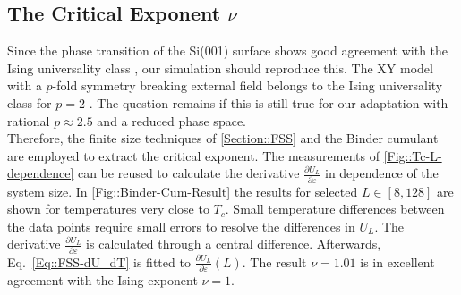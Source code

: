 	\subsection{The Critical Exponent ${\nu}$} \label{Section::static-scaling}
	Since the phase transition of the Si(001) surface shows good agreement with the Ising universality class \cite{brand2023critical}, our simulation should reproduce this. The XY model with a $p$-fold symmetry breaking external field belongs to the Ising universality class for $p=2$ \cite{jose1977renormalization}. The question remains if this is still true for our adaptation with rational $p \approx 2.5$ and a reduced phase space. \\
	
	Therefore, the finite size techniques of \autoref{Section::FSS} and the Binder cumulant are employed to extract the critical exponent. The measurements of \autoref{Fig::Tc-L-dependence} can be reused to calculate the derivative $\tfrac{\partial U_L}{\partial \varepsilon}$ in dependence of the system size.
	In \autoref{Fig::Binder-Cum-Result} the results for selected $L \in \left[8, 128\right]$ are shown for temperatures very close to $T_c$. Small temperature differences between the data points require small errors to resolve the differences in $U_L$. The derivative $\tfrac{\partial U_L}{\partial \varepsilon}$ is calculated through a central difference. Afterwards, Eq.~\eqref{Eq::FSS-dU_dT} is fitted to $\tfrac{\partial U_L}{\partial \varepsilon} (L)$. The result $\nu =	1.01$ is in excellent agreement with the Ising exponent $\nu =	1$.
